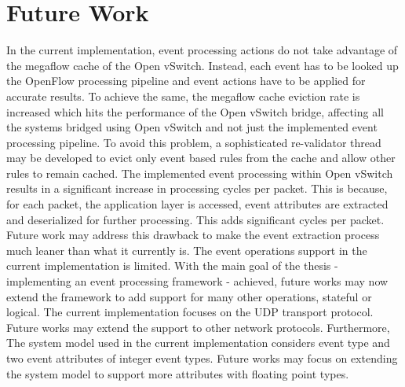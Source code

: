 \section{Future Work}
In the current implementation, event processing actions do not take advantage of the megaflow cache of the Open vSwitch. Instead, each event has to be looked up the OpenFlow processing pipeline and event actions have to be applied for accurate results. To achieve the same, the megaflow cache eviction rate is increased which hits the performance of the Open vSwitch bridge, affecting all the systems bridged using Open vSwitch and not just the implemented event processing pipeline. To avoid this problem, a sophisticated re-validator thread may be developed to evict only event based rules from the cache and allow other rules to remain cached. \newline \newline
The implemented event processing within Open vSwitch results in a significant increase in processing cycles per packet. This is because, for each packet, the application layer is accessed, event attributes are extracted and deserialized for further processing. This adds significant cycles per packet. Future work may address this drawback to make the event extraction process much leaner than what it currently is.\newline \newline
The event operations support in the current implementation is limited. With the main goal of the thesis - implementing an event processing framework - achieved, future works may now extend the framework to add support for many other operations, stateful or logical.\newline \newline
The current implementation focuses on the UDP transport protocol. Future works may extend the support to other network protocols. Furthermore, The system model used in the current implementation considers event type and two event attributes of integer event types. Future works may focus on extending the system model to support more attributes with floating point types.  
